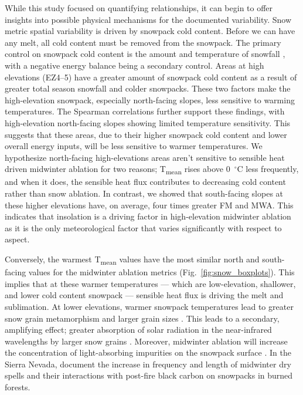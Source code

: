 While this study focused on quantifying relationships, it can begin to offer insights into possible physical mechanisms for the documented variability.
Snow metric spatial variability is driven by snowpack cold content. Before we can have any melt, all cold content must be removed from the snowpack. The primary control on snowpack cold content is the amount and temperature of snowfall \citep{jenningsObservationsSimulationsSeasonal2018}, with a negative energy balance being a secondary control. Areas at high elevations (EZ4--5) have a greater amount of snowpack cold content as a result of greater total season snowfall and colder snowpacks. These two factors make the high-elevation snowpack, especially north-facing slopes, less sensitive to warming temperatures. The Spearman correlations further support these findings, with high-elevation north-facing slopes showing limited temperature sensitivity. This suggests that these areas, due to their higher snowpack cold content and lower overall energy inputs, will be less sensitive to warmer temperatures. We hypothesize north-facing high-elevations areas aren't sensitive to sensible heat driven midwinter ablation for two reasons; T\textsubscript{mean} rises above 0~$^{\circ}$C less frequently, and when it does, the sensible heat flux contributes to decreasing cold content rather than snow ablation. In contrast, we showed that south-facing slopes at these higher elevations have, on average, four times greater FM and MWA. This indicates that insolation is a driving factor in high-elevation midwinter ablation as it is the only meteorological factor that varies significantly with respect to aspect. 

Conversely, the warmest T\textsubscript{mean} values have the most similar north and south-facing values for the midwinter ablation metrics (Fig.~\ref{fig:snow_boxplots}). This implies that at these warmer temperatures --- which are low-elevation, shallower, and lower cold content snowpack --- sensible heat flux is driving the melt and sublimation. At lower elevations, warmer snowpack temperatures lead to greater snow grain metamorphism and larger grain sizes \citep{colbeckOverviewSeasonalSnow1982}. This leads to a secondary, amplifying effect; greater absorption of solar radiation in the near-infrared wavelengths by larger snow grains \citep{wiscombeModelSpectralAlbedo1980, warrenModelSpectralAlbedo1980}. Moreover, midwinter ablation will increase the concentration of light-absorbing impurities on the snowpack surface \citep{gleasonCharredForestsIncrease2013,skilesRadiativeForcingLightabsorbing2018}. In the Sierra Nevada, \cite{hatchettMidwinterDrySpells2023} document the increase in frequency and length of midwinter dry spells and their interactions with post-fire black carbon on snowpacks in burned forests. 

